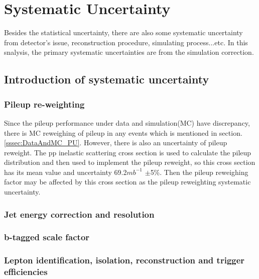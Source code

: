 

\section{ Systematic Uncertainty}
\label{sec:Systematic}

	Besides the statistical uncertainty, there are also some systematic uncertainty from detector's issue, reconstruction procedure, simulating process...etc. In this snalysis, the primary systematic uncertainties are from the simulation correction. 

	\subsection{Introduction of systematic uncertainty}
	\label{ssec:Syst_type}
		\subsubsection{Pileup re-weighting}
		\label{sssec:Syst_PU}


			Since the pileup performance under data and simulation(MC) have discrepancy, there is MC reweighing of pileup in any events which is mentioned in section.\ref{sssec:DataAndMC_PU}. However, there is also an uncertainty of pileup reweight. The pp inelastic scattering cross section is used to calculate the pileup distribution and then used to implement the pileup reweight, so this cross section has its mean value and uncertainty 69.2$mb^{-1}$ $\pm$5\%. Then the pileup reweighing factor may be affected by this cross section as the pileup reweighting systematic uncertainty.

		\subsubsection{Jet energy correction and resolution}
		\label{sssec:Syst_JECJER}

			

		\subsubsection{b-tagged scale factor}
		\label{sssec:Syst_btag}

		\subsubsection{Lepton identification, isolation, reconstruction and trigger efficiencies}
		\label{sssec:Syst_JECJER}

